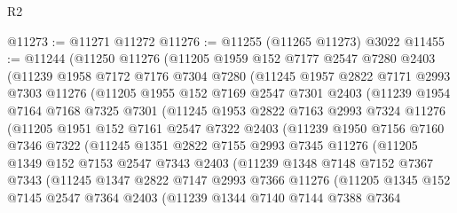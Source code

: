 \begin{lexlean}{R2}
\begin{coremodule}
@11273 := @11271 @11272
@11276 := @11255 (@11265 @11273) @3022
@11455 := @11244
    (@11250
      @11276
      (@11205
        @1959
        @152
        @7177
        @2547
        @7280
        @2403
        (@11239
          @1958
          @7172
          @7176
          @7304
          @7280
          (@11245
            @1957
            @2822
            @7171
            @2993
            @7303
            @11276
            (@11205
              @1955
              @152
              @7169
              @2547
              @7301
              @2403
              (@11239
                @1954
                @7164
                @7168
                @7325
                @7301
                (@11245
                  @1953
                  @2822
                  @7163
                  @2993
                  @7324
                  @11276
                  (@11205
                    @1951
                    @152
                    @7161
                    @2547
                    @7322
                    @2403
                    (@11239
                      @1950
                      @7156
                      @7160
                      @7346
                      @7322
                      (@11245
                        @1351
                        @2822
                        @7155
                        @2993
                        @7345
                        @11276
                        (@11205
                          @1349
                          @152
                          @7153
                          @2547
                          @7343
                          @2403
                          (@11239
                            @1348
                            @7148
                            @7152
                            @7367
                            @7343
                            (@11245
                              @1347
                              @2822
                              @7147
                              @2993
                              @7366
                              @11276
                              (@11205
                                @1345
                                @152
                                @7145
                                @2547
                                @7364
                                @2403
                                (@11239
                                  @1344
                                  @7140
                                  @7144
                                  @7388
                                  @7364

\end{coremodule}
\end{lexlean}
